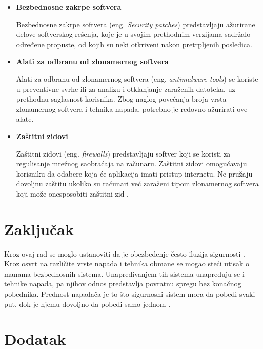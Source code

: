 \documentclass[a4paper]{article}
\begin{document}
\begin{itemize}
\item \textbf{Bezbednosne zakrpe softvera}

Bezbednosne zakrpe softvera (eng. \textit{Security patches}) predstavljaju ažurirane delove softverskog 
rešenja, koje je u svojim prethodnim verzijama sadržalo određene propuste, od kojih su neki otkriveni nakon pretrpljenih posledica.


\item \textbf{Alati za odbranu od zlonamernog softvera}

Alati za odbranu od zlonamernog softvera (eng. \textit{antimalware tools}) se koriste u preventivne svrhe ili za analizu i otklanjanje zaraženih datoteka, uz prethodnu saglasnost korisnika. Zbog naglog povećanja broja vrsta zlonamernog softvera i tehnika napada, potrebno je redovno ažurirati ove alate.

\item \textbf{Zaštitni zidovi}

Zaštitni zidovi (eng. \textit{firewalls}) predstavljaju softver koji se koristi za regulisanje mrežnog saobraćaja na računaru. Zaštitni zidovi omogućavaju korisniku da odabere koja će aplikacija imati pristup internetu. Ne pružaju dovoljnu zaštitu ukoliko su računari već zaraženi tipom zlonamernog softvera koji može onesposobiti zaštitni zid \cite{ethics}.

\end{itemize}

\section{Zaključak}
\label{sec:zakljucak}

Kroz ovaj rad se moglo ustanoviti da je obezbeđenje često iluzija sigurnosti \cite{deception}. Kroz osvrt na različite vrste napada i tehnika obmane se mogao steći utisak o manama bezbednosnih sistema. Unapređivanjem tih sistema unapređuju se i tehnike napada, pa njihov odnos predstavlja povratnu spregu bez konačnog pobednika. 
Prednost napadača je to što sigurnosni sistem mora da pobedi svaki put, dok je njemu dovoljno da pobedi samo jednom \cite{intrusion}.


\appendix
 


\appendix
\section{Dodatak}
\end{document}
